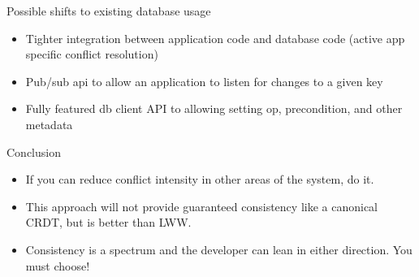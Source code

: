 \documentclass[17pt]{beamer}
\begin{document}
\begin{frame}{Possible shifts to existing database usage}
  \begin{itemize}
    \item Tighter integration between application code and database
      code (active app specific conflict resolution) \pause
    \item Pub/sub api to allow an application to listen for changes to
      a given key \pause
    \item Fully featured db client API to allowing setting op,
      precondition, and other metadata \pause
  \end{itemize}
\end{frame}
\begin{frame}{Conclusion}
  \begin{itemize}
    \item If you can reduce conflict intensity in other areas of the
      system, do it.
    \item This approach will not provide guaranteed consistency like a
      canonical CRDT, but is better than LWW.
    \item Consistency is a spectrum and the developer can lean in
      either direction. You must choose!
  \end{itemize}
\end{frame}
\end{document}
